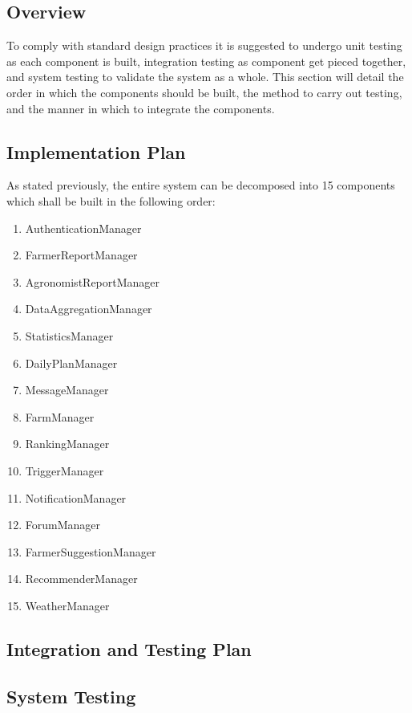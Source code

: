 

\subsection{Overview}
To comply with standard design practices it is suggested to undergo unit testing as each component is built, integration testing as component get pieced together, and system testing to validate the system as a whole. This section will detail the order in which the components should be built, the method to carry out testing, and the manner in which to integrate the components.

 
\subsection{Implementation Plan}

As stated previously, the entire system can be decomposed into 15 components which shall be built in the following order: 

\begin{enumerate}
\item AuthenticationManager
\item FarmerReportManager
\item AgronomistReportManager
\item DataAggregationManager
\item StatisticsManager
\item DailyPlanManager
\item MessageManager
\item FarmManager
\item RankingManager
\item TriggerManager
\item NotificationManager
\item ForumManager
\item FarmerSuggestionManager
\item RecommenderManager
\item WeatherManager
\end{enumerate}






\subsection{Integration and Testing Plan}
\subsection{System Testing}